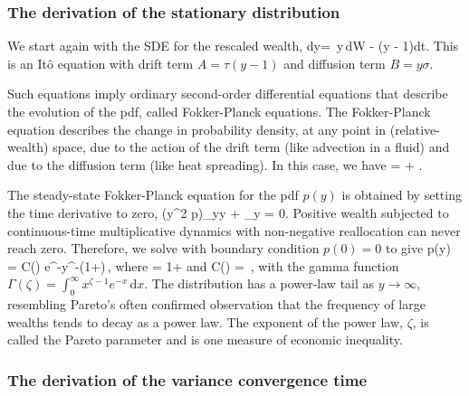 \subsubsection{The derivation of the stationary distribution}\label{app:stat}

We start again with the SDE for the rescaled wealth, 
\be
dy= \sigma\,y\,dW - \tau\left(y - 1\right)dt.
\ee
This is an It\^o equation with drift term 
$A=\tau(y - 1)$ and diffusion term $B=y \sigma$.

Such equations imply ordinary second-order differential equations that describe the evolution of the pdf, called Fokker-Planck equations. 
The Fokker-Planck equation describes the change in probability density, at any point in (relative-wealth) space, due to the action of the drift term (like advection in a fluid) and due to the diffusion term (like heat spreading). In this case, we have
\be
{}= + .
\ee

The steady-state Fokker-Planck equation for the pdf $p\left(y\right)$ is obtained by setting the time derivative to zero,
\be
{}\left(y^2 p\right)_{yy} + \tau{}_y = 0.
\ee
Positive wealth subjected to continuous-time multiplicative dynamics with non-negative reallocation can never reach zero. Therefore, we solve  with boundary condition $p\left(0\right)=0$ to give
\be
p\left(y\right) = C\left(\zeta\right) e^{-}y^{-\left(1+\zeta\right)}\,,
\ee
where 
\be
\zeta = 1+
\ee
and
\be
C\left(\zeta\right) = \frac{\left(\zeta -1\right)^\zeta}{\Gamma \left(\zeta \right)}\,,
\ee
with the gamma function $\Gamma\left(\zeta\right) = \int_0^\infty x^{\zeta-1} e^{-x}\,\mathrm{d}x$. The distribution has a power-law tail as $y\to\infty$, resembling Pareto's often confirmed observation that the frequency of large wealths tends to decay as a power law. The exponent of the power law, $\zeta$, is called the Pareto parameter and is one measure of economic inequality.


\subsubsection{The derivation of the variance convergence time}\label{app:var_conv}


